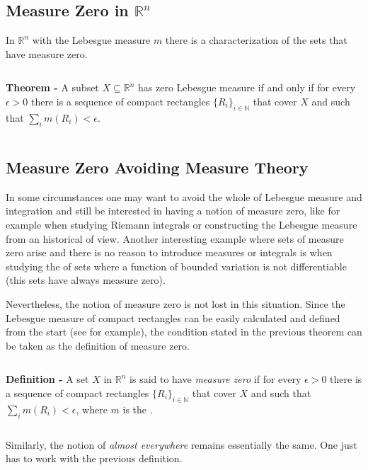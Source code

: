 \documentclass[12pt]{article}
\begin{document}
\subsection{Measure Zero in $\mathbb{R}^n$}
In $\mathbb{R}^n$ with the Lebesgue measure $m$ there is a  characterization of the sets that have measure zero.

$\,$

{\bf Theorem -} A subset $X \subseteq \mathbb{R}^n$ has zero Lebesgue measure if and only if for every $\epsilon >0$ there is a sequence of compact rectangles $\{R_i\}_{i \in \mathbb{N}}$ that cover $X$ and such that $\sum_{i} m(R_i) < \epsilon$.

$\,$

\subsection{Measure Zero Avoiding Measure Theory}

In some circumstances one may want to avoid the whole  of Lebesgue measure and integration and still be interested in having a notion of measure zero, like for example when studying Riemann integrals or constructing the Lebesgue measure from an historical  of view. Another interesting example where sets of measure zero arise and there is no reason to introduce measures or integrals is when studying the of sets where a function of bounded variation is not differentiable (this sets have always measure zero).

Nevertheless, the notion of measure zero is not lost in this situation. Since the Lebesgue measure of compact rectangles can be easily calculated and defined from the start (see  for example), the condition stated in the previous theorem can be taken as the definition of measure zero.

$\,$

{\bf Definition -} A set $X$ in $\mathbb{R}^n$ is said to have \emph{measure zero} if for every $\epsilon >0$ there is a sequence of compact rectangles $\{R_i\}_{i \in \mathbb{N}}$ that cover $X$ and such that $\sum_{i} m(R_i) < \epsilon$, where $m$ is the .

$\,$

Similarly, the notion of \emph{almost everywhere} remains essentially the same. One just has to work with the previous definition.
\end{document}
